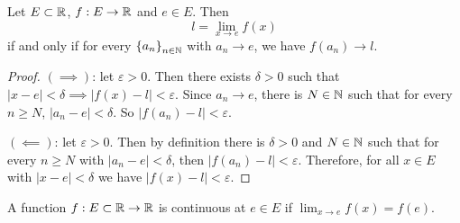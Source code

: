 \begin{proposition}[]
	Let $E \subset \mathbb{R}$, $f: E \to \mathbb{R}$ and $e \in E$.
	Then
	\[
		l = \lim_{x \to e} f(x)
	\]
	if and only if for every
	$ \left\{ a_n \right\}_{n \in \mathbb{N}} $
	with $a_n \to e$, we have $f(a_n) \to l$.
\end{proposition}

\begin{proof}
	$(\implies)$: let $\varepsilon > 0$. 
	Then there exists $\delta > 0$ such that
	$
		\left\lvert x - e \right\rvert < \delta
		\implies \left\lvert f(x) - l \right\rvert < \varepsilon
	$. Since $a_n \to e$, there is $N \in \mathbb{N}$ such that for every $n \geq N$,
	$\left\lvert a_n - e \right\rvert < \delta$.
	So $\left\lvert f(a_n) - l \right\rvert < \varepsilon$.
	
	$(\impliedby)$: let $\varepsilon > 0$.
	Then by definition there is $\delta > 0$
	and $N \in \mathbb{N}$ such that for every $n \geq N$
	with $\left\lvert a_n - e \right\rvert < \delta$,
	then $\left\lvert f(a_n) - l \right\rvert < \varepsilon$.
	Therefore, for all $x \in E$ with $\left\lvert x - e \right\rvert < \delta$
	we have $\left\lvert f(x) - l \right\rvert < \varepsilon$.
\end{proof}

A function $f: E \subset \mathbb{R} \to \mathbb{R}$ is continuous at $e \in E$
if $\lim_{x \to e} f(x) = f(e)$.
